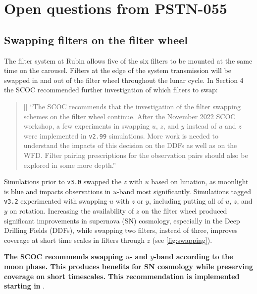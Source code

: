 
\section{Open questions from PSTN-055} \label{sec:openquestions}

\subsection{Swapping filters on the filter wheel}\label{sec:filterswap}
The filter system at Rubin allows five of the six filters to be mounted at the same time on the carousel. Filters at the edge of the system transmission will be swapped in and out of the filter wheel throughout the lunar cycle. In  Section 4 the SCOC recommended further investigation of which filters to swap: 
\begin{quote}{[] ``The SCOC recommends that the investigation of the filter swapping schemes on the filter wheel continue. After the November 2022 SCOC workshop, a few experiments in swapping $u$, $z$, and $y$ instead of $u$ and $z$ were implemented in \texttt{v2.99} simulations. More work is needed to understand the impacts of this decision on the DDFs as well as on the WFD. Filter pairing prescriptions for the observation pairs should also be explored in some more depth.''}
\end{quote}

 Simulations prior to \texttt{v3.0} swapped the $z$ with $u$ based on lunation, as moonlight is blue and impacts observations in $u$-band most significantly. Simulations tagged \texttt{v3.2}  experimented with  swapping $u$ with $z$ or $y$, including putting all of $u$, $z$, and $y$ on rotation. Increasing the availability of $z$ on the filter wheel produced significant improvements in supernova (SN) cosmology, especially in the Deep Drilling Fields (DDFs), while swapping two filters, instead of three, improves coverage at short time scales in filters through $z$ (see \autoref{fig:swapping}). 
 
{\bf The SCOC recommends swapping $u$- and $y$-band according to the moon phase. This produces benefits for SN cosmology while preserving coverage on short timescales. This recommendation is implemented starting in }.

